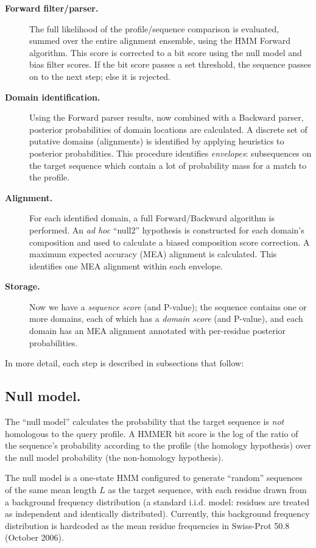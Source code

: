 \begin{description}
\item[\textbf{Forward filter/parser.}] The full likelihood of the
  profile/sequence comparison is evaluated, summed over the entire
  alignment ensemble, using the HMM Forward algorithm. This score is
  corrected to a bit score using the null model and bias filter
  scores. If the bit score passes a set threshold, the sequence passes
  on to the next step; else it is rejected.

\item[\textbf{Domain identification.}] Using the Forward parser
  results, now combined with a Backward parser, posterior
  probabilities of domain locations are calculated. A discrete set of
  putative domains (alignments) is identified by applying heuristics
  to posterior probabilities. This procedure identifies
  \emph{envelopes}: subsequences on the target sequence which contain
  a lot of probability mass for a match to the profile.

\item[\textbf{Alignment.}] For each identified domain, a full
  Forward/Backward algorithm is performed. An \emph{ad hoc} ``null2''
  hypothesis is constructed for each domain's composition and used to
  calculate a biased composition score correction. A maximum expected
  accuracy (MEA) alignment is calculated. This identifies one MEA
  alignment within each envelope.

\item[\textbf{Storage.}] Now we have a \emph{sequence score} (and
  P-value); the sequence contains one or more domains, each of which
  has a \emph{domain score} (and P-value), and each domain has an MEA
  alignment annotated with per-residue posterior probabilities.

\end{description}

In more detail, each step is described in subsections that follow:

\subsection{Null model.}

The ``null model'' calculates the probability that the target sequence
is \emph{not} homologous to the query profile. A HMMER bit score is
the log of the ratio of the sequence's probability according to the
profile (the homology hypothesis) over the null model probability (the
non-homology hypothesis). 

The null model is a one-state HMM configured to generate ``random''
sequences of the same mean length $L$ as the target sequence, with
each residue drawn from a background frequency distribution (a
standard i.i.d. model: residues are treated as independent and
identically distributed). Currently, this background frequency
distribution is hardcoded as the mean residue frequencies in Swiss-Prot
50.8 (October 2006).


